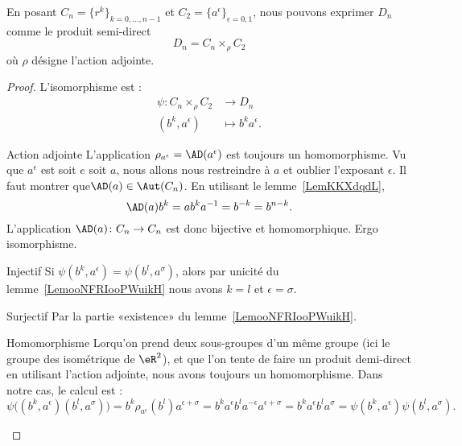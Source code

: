 \begin{proposition}
    En posant \( C_n=\{ r^k \}_{k=0,\ldots, n-1}\) et \( C_2=\{ a^{\epsilon} \}_{\epsilon=0,1}\), nous pouvons exprimer \( D_n\) comme le produit semi-direct
    \begin{equation}
        D_n=C_n\times_{\rho}C_2
    \end{equation}
    où \( \rho\) désigne l'action adjointe.
\end{proposition}

\begin{proof}
    L'isomorphisme est :
    \begin{equation}
        \begin{aligned}
            \psi\colon C_n\times_{\rho}C_2&\to D_n \\
            (b^k,a^{\epsilon})&\mapsto b^ka^{\epsilon}.
        \end{aligned}
    \end{equation}
    \begin{subproof}
        \item[Action adjointe]
            L'application \( \rho_{a^{\epsilon}}=\AD(a^{\epsilon})\) est toujours un homomorphisme. Vu que \( a^{\epsilon}\) est soit \( e\) soit \( a\), nous allons nous restreindre à \( a\) et oublier l'exposant \( \epsilon\). Il faut montrer que\( \AD(a)\in\Aut(C_n)\). En utilisant le lemme~\ref{LemKKXdqdL},
            \begin{equation}
                \AD(a)b^k=ab^ka^{-1}=b^{-k}=b^{n-k}.
            \end{equation}
            L'application \( \AD(a)\colon C_n\to C_n\) est donc bijective et homomorphique. Ergo isomorphisme.
        \item[Injectif]
            Si \( \psi(b^k,a^{\epsilon})=\psi(b^l,a^{\sigma})\), alors par unicité du lemme~\ref{LemooNFRIooPWuikH} nous avons \( k=l\) et \( \epsilon=\sigma\).
        \item[Surjectif]
            Par la partie «existence»  du lemme~\ref{LemooNFRIooPWuikH}.
        \item[Homomorphisme]
            Lorqu'on prend deux sous-groupes d'un même groupe (ici le groupe des isométrique de \( \eR^2\)), et que l'on tente de faire un produit demi-direct en utilisant l'action adjointe, nous avons toujours un homomorphisme. Dans notre cas, le calcul est :
            \begin{equation}
                \psi\big( (b^k,a^{\epsilon})(b^l,a^{\sigma}) \big)=b^k\rho_{a^{\epsilon}}(b^l)a^{\epsilon+\sigma}=b^ka^{\epsilon}b^la^{-\epsilon}a^{\epsilon+\sigma}=b^ka^{\epsilon}b^la^{\sigma}=\psi(b^k,a^{\epsilon})\psi(b^l,a^{\sigma}).
            \end{equation}
    \end{subproof}
\end{proof}

